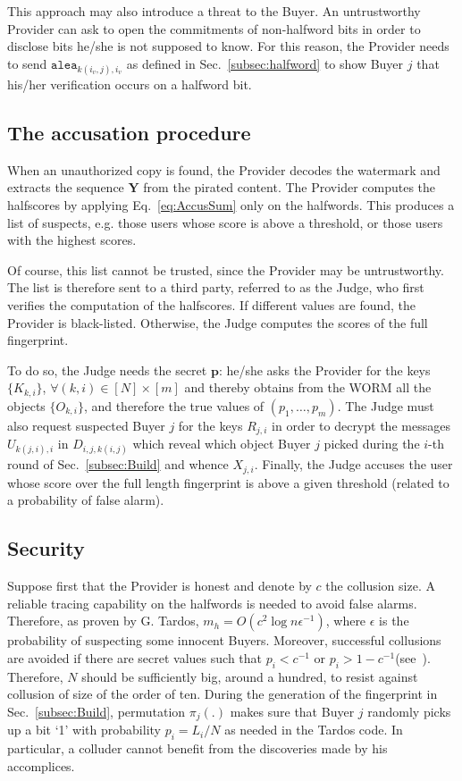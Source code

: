 \documentclass{article}
\begin{document}
This approach may also introduce a threat to the Buyer.  An untrustworthy Provider can ask to open
the commitments of non-halfword bits in order to disclose bits he/she
is not supposed to know. For this reason, the Provider needs to send
$\mathtt{alea}_{k(i_v,j),i_v}$ as defined in
Sec.~\ref{subsec:halfword} to show Buyer $j$ that his/her verification occurs on a halfword bit.

\subsection{The accusation procedure}
\label{sec:Accuse}

When an unauthorized copy is found, 
the  Provider decodes the watermark and extracts the sequence
$\mathbf{Y}$ from the pirated content. The Provider computes the
halfscores by applying Eq.~\eqref{eq:AccusSum} only on the
halfwords. This produces a list of suspects, e.g. those users whose score
is above a threshold, or those users with the highest scores.  




Of course, this list cannot be trusted, since the Provider may be
untrustworthy.   
The list is therefore sent to a third party, referred to as the Judge,  who first verifies the computation of
the halfscores. 
If different values are found, the Provider is
black-listed. Otherwise, the Judge computes the scores of the full
fingerprint.

To do so, the Judge needs the secret $\mathbf{p}$: he/she
asks the Provider for the keys $\{K_{k,i}\}$, $\forall
(k,i)\in[N]\times[m]$ and thereby obtains from the WORM all the objects
$\{O_{k,i}\}$, and therefore the true values of $(p_1,\ldots,p_m)$. 
The Judge must also request suspected Buyer $j$ for the keys $R_{j,i}$
in order to decrypt the messages $U_{k(j,i),i}$ in $D_{i,j,k(i,j)}$ which
reveal which object Buyer $j$ picked during the $i$-th round of
Sec.~\ref{subsec:Build} and whence $X_{j,i}$. 
Finally, the Judge
accuses the user whose score over the full length fingerprint is above a
given threshold (related to a probability of false alarm).



\subsection{Security}
Suppose first that the Provider is honest and denote by $c$ the
collusion size. A reliable tracing capability on the halfwords is
needed to avoid false alarms. Therefore, as proven by G. Tardos, $m_h=O(c^2\log
n\epsilon^{-1})$, where $\epsilon$ is the probability of suspecting
some innocent Buyers. Moreover, successful collusions are avoided if
there are secret values such that $p_i<c^{-1}$ or
$p_i>1-c^{-1}$(see~\cite{Furon2009:Worst}).  Therefore, $N$ should be
sufficiently big, around a hundred, to resist against collusion of size
of the order of ten. 
During the generation of the fingerprint in
Sec.~\ref{subsec:Build}, permutation $\pi_{j}(.)$ makes sure that Buyer
$j$ randomly picks up a bit `1' with probability $p_{i}=L_{i}/N$ as
needed in the Tardos code. In particular, a colluder cannot benefit
from the discoveries made by his accomplices.
\end{document}
